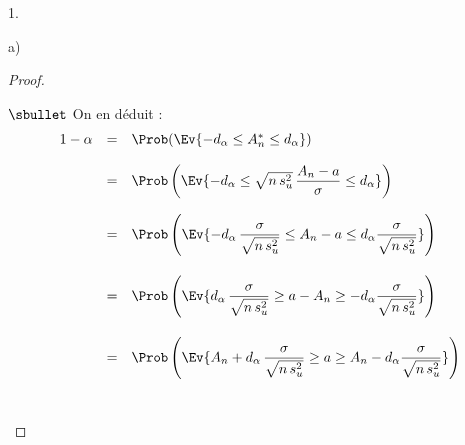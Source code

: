 \documentclass[11pt]{article}%
\begin{document}
\begin{noliste}{1.}
\begin{noliste}{a)}
\begin{proof}
\begin{noliste}{$\sbullet$}
    On en déduit :
    \[
     \begin{array}{rcl}
      1-\alpha &=& \Prob(\Ev{-d_\alpha \leq A_n^* \leq d_\alpha})
      \\[.4cm]
      &=& \Prob\left(\Ev{-d_\alpha \leq \sqrt{n \, s_u^2} \, \dfrac{A_n 
      - a}{\sigma} \leq d_\alpha}\right)
      \\[.6cm]
      &=& \Prob\left(\Ev{ -d_\alpha \, 
      \dfrac{\sigma}{\sqrt{n \, s_u^2}} \leq A_n -a \leq d_\alpha
      \dfrac{\sigma}{\sqrt{n \, s_u^2}}}\right)
      \\[.8cm]
      &=& \Prob\left(\Ev{ d_\alpha \, 
      \dfrac{\sigma}{\sqrt{n \, s_u^2}} \geq a -A_n \geq -d_\alpha
      \dfrac{\sigma}{\sqrt{n \, s_u^2}}}\right)
      \\[.8cm]
      &=& \Prob\left(\Ev{A_n + d_\alpha \, 
      \dfrac{\sigma}{\sqrt{n \, s_u^2}} \geq a \geq A_n -d_\alpha
      \dfrac{\sigma}{\sqrt{n \, s_u^2}}}\right)
     \end{array}
    \]
    ~\\[-1.4cm]
   \end{noliste}
  \end{proof}
 \end{noliste}
\end{noliste}
\end{document}
